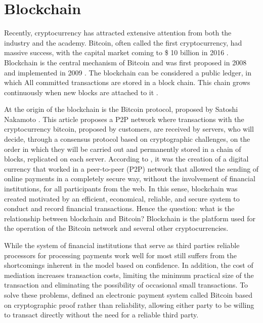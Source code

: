 \section{Blockchain}\label{sec:blockchain}

Recently, cryptocurrency has attracted extensive attention from both the industry and the academy. Bitcoin, often called the first cryptocurrency, had massive success, with the capital market coming to \$ 10 billion in 2016 \cite{coindesk}. Blockchain is the central mechanism of Bitcoin and was first proposed in 2008 and implemented in 2009 \cite{nakamoto2008bitcoin}. The blockchain can be considered a  public ledger, in which All committed transactions are stored in a block chain. This chain grows continuously when new blocks are attached to it \cite{zheng2016blockchain}.

At the origin of the blockchain is the Bitcoin protocol, proposed by Satoshi Nakamoto \cite{nakamoto2008bitcoin}. This article proposes a P2P network where transactions with the cryptocurrency bitcoin, proposed by customers, are received by servers, who will decide, through a consensus protocol based on cryptographic challenges, on the order in which they will be carried out and permanently stored in a chain of blocks, replicated on each server. According to , it was the creation of a digital currency that worked in a peer-to-peer (P2P) network that allowed the sending of online payments in a completely secure way, without the involvement of financial institutions, for all participants from the web. In this sense, blockchain was created motivated by an efficient, economical, reliable, and secure system to conduct and record financial transactions. Hence the question: what is the relationship between blockchain and Bitcoin? Blockchain is the platform used for the operation of the Bitcoin network and several other cryptocurrencies.

While the system of financial institutions that serve as third parties reliable processors for processing payments work well for most still suffers from the shortcomings inherent in the model based on confidence. In addition, the cost of mediation increases transaction costs, limiting the minimum practical size of the transaction and eliminating the possibility of occasional small transactions. To solve these problems, \cite{nakamoto2008bitcoin} defined an electronic payment system called Bitcoin based on cryptographic proof rather than reliability, allowing either party to be willing to transact directly without the need for a reliable third party.

